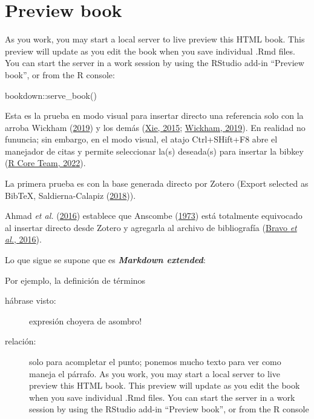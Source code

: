 \documentclass[
  11pt,
  twoside]{book}
\newenvironment{Shaded}{\begin{snugshade}}{\end{snugshade}}
\newcommand{\FunctionTok}[1]{\textcolor[rgb]{0.00,0.00,0.00}{#1}}
\newcommand{\NormalTok}[1]{#1}
\newcommand{\SpecialCharTok}[1]{\textcolor[rgb]{0.00,0.00,0.00}{#1}}
\theoremstyle{definition}
\theoremstyle{definition}
\theoremstyle{definition}
\theoremstyle{definition}
\theoremstyle{remark}
\begin{document}
\hypertarget{preview-book}{%
\section{\texorpdfstring{Preview book }{Preview book }}\label{preview-book}}

As you work, you may start a local server to live preview this HTML book. This preview will update as you edit the book when you save individual .Rmd files. You can start the server in a work session by using the RStudio add-in ``Preview book'', or from the R console:

\begin{Shaded}
\begin{Highlighting}[]
\NormalTok{bookdown}\SpecialCharTok{::}\FunctionTok{serve\_book}\NormalTok{()}
\end{Highlighting}
\end{Shaded}

Esta es la prueba en modo visual para insertar directo una referencia solo con la arroba Wickham (\protect\hyperlink{ref-wickham2019Advanced}{2019}) y los demás (\protect\hyperlink{ref-xie2015}{Xie, 2015}; \protect\hyperlink{ref-wickham2019Advanced}{Wickham, 2019}). En realidad no fununcia; sin embargo, en el modo visual, el atajo Ctrl+SHift+F8 abre el manejador de citas y permite seleccionar la(s) deseada(s) para insertar la bibkey (\protect\hyperlink{ref-R-base}{R Core Team, 2022}).

La primera prueba es con la base generada directo por Zotero (Export selected as BibTeX, Saldierna-Calapiz (\protect\hyperlink{ref-saldierna-calapiz2018Efectored}{2018})).

Ahmad \emph{et al.} (\protect\hyperlink{ref-ahmad2016UsingFisher}{2016}) establece que Anscombe (\protect\hyperlink{ref-anscombe1973GraphsStatistical}{1973}) está totalmente equivocado al insertar directo desde Zotero y agregarla al archivo de bibliografía (\protect\hyperlink{ref-bravo2016Teachinghigher}{Bravo \emph{et al.}, 2016}).

Lo que sigue se supone que es \textbf{\emph{Markdown extended}}:

Por ejemplo, la definición de términos

\begin{description}
\item[hábrase visto:]
expresión choyera de asombro!
\item[relación:]
solo para acompletar el punto; ponemos mucho texto para ver como maneja el párrafo. As you work, you may start a local server to live preview this HTML book. This preview will update as you edit the book when you save individual .Rmd files. You can start the server in a work session by using the RStudio add-in ``Preview book'', or from the R console
\end{description}
\end{document}

